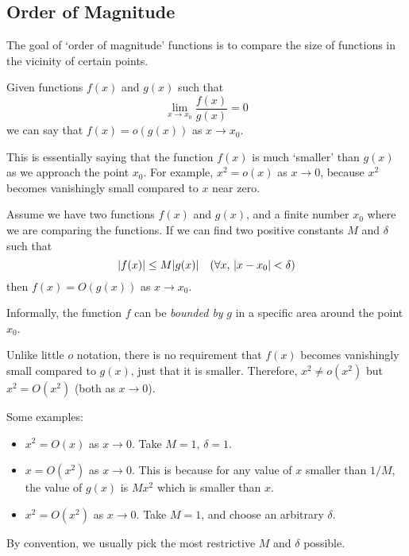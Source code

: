 \documentclass{article}
\begin{document}
	\subsection{Order of Magnitude}
	The goal of `order of magnitude' functions is to compare the size of functions in the vicinity of certain points.
	\begin{definition}[Little $o$]
		Given functions $f(x)$ and $g(x)$ such that
		\begin{equation}
			\lim\limits_{x \to x_0} \frac{f(x)}{g(x)} = 0
		\end{equation}
		we can say that $f(x) = o(g(x))$ as $x \to x_0$.
	\end{definition}

	This is essentially saying that the function $f(x)$ is much `smaller' than $g(x)$ as we approach the point $x_0$. For example, $x^2 = o(x)$ as $x \to 0$, because $x^2$ becomes vanishingly small compared to $x$ near zero.
	
	\begin{definition}
		Assume we have two functions $f(x)$ and $g(x)$, and a finite number $x_0$ where we are comparing the functions. If we can find two positive constants $M$ and $\delta$ such that
		\begin{equation}
			\abs{f(x)} \leq M\abs{g(x)} \quad(\forall x,\, \abs{x-x_0} < \delta)
		\end{equation}
		then $f(x) = O(g(x))$ as $x \to x_0$.
	\end{definition}
	Informally, the function $f$ can be \textit{bounded by} $g$ in a specific area around the point $x_0$.
	
	Unlike little $o$ notation, there is no requirement that $f(x)$ becomes vanishingly small compared to $g(x)$, just that it is smaller. Therefore, $x^2 \neq o(x^2)$ but $x^2 = O(x^2)$ (both as $x \to 0$).
	
	Some examples:
	\begin{itemize}
		\item $x^2 = O(x)$ as $x \to 0$. Take $M = 1$, $\delta = 1$.
		\item $x = O(x^2)$ as $x \to 0$. This is because for any value of $x$ smaller than $1/M$, the value of $g(x)$ is $Mx^2$ which is smaller than $x$.
		\item $x^2 = O(x^2)$ as $x \to 0$. Take $M = 1$, and choose an arbitrary $\delta$.
	\end{itemize}

	By convention, we usually pick the most restrictive $M$ and $\delta$ possible.
	
\end{document}
